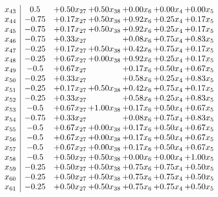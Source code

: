 \documentclass[8pt]{article}
\begin{document}
\[\begin{array}{c| c c@{\hskip 2pt} c@{\hskip 2pt} c@{\hskip 2pt} c@{\hskip 2pt} c@{\hskip 2pt} }
 x_{43}   &  0.5 & +  0.50 x_{27} & +  0.50 x_{38} & +  0.00 x_{6} & +  0.00 x_{4} & +  0.00 x_{5}\\
 x_{44}   &  -0.75 & +  0.17 x_{27} & +  0.50 x_{38} & +  0.92 x_{6} & +  0.25 x_{4} & +  0.17 x_{5}\\
 x_{45}   &  -0.75 & +  0.17 x_{27} & +  0.50 x_{38} & +  0.92 x_{6} & +  0.25 x_{4} & +  0.17 x_{5}\\
 x_{46}   &  -0.75 & +  0.33 x_{27} &   & +  0.08 x_{6} & +  0.75 x_{4} & +  0.83 x_{5}\\
 x_{47}   &  -0.25 & +  0.17 x_{27} & +  0.50 x_{38} & +  0.42 x_{6} & +  0.75 x_{4} & +  0.17 x_{5}\\
 x_{48}   &  -0.25 & +  0.67 x_{27} & +  0.00 x_{38} & +  0.92 x_{6} & +  0.25 x_{4} & +  0.17 x_{5}\\
 x_{49}   &  -0.5 & +  0.67 x_{27} &   & +  0.17 x_{6} & +  0.50 x_{4} & +  0.67 x_{5}\\
 x_{50}   &  -0.25 & +  0.33 x_{27} &   & +  0.58 x_{6} & +  0.25 x_{4} & +  0.83 x_{5}\\
 x_{51}   &  -0.25 & +  0.17 x_{27} & +  0.50 x_{38} & +  0.42 x_{6} & +  0.75 x_{4} & +  0.17 x_{5}\\
 x_{52}   &  -0.25 & +  0.33 x_{27} &   & +  0.58 x_{6} & +  0.25 x_{4} & +  0.83 x_{5}\\
 x_{53}   &  -0.5 & +  0.67 x_{27} & +  1.00 x_{38} & +  0.17 x_{6} & +  0.50 x_{4} & +  0.67 x_{5}\\
 x_{54}   &  -0.75 & +  0.33 x_{27} &   & +  0.08 x_{6} & +  0.75 x_{4} & +  0.83 x_{5}\\
 x_{55}   &  -0.5 & +  0.67 x_{27} & +  0.00 x_{38} & +  0.17 x_{6} & +  0.50 x_{4} & +  0.67 x_{5}\\
 x_{56}   &  -0.5 & +  0.67 x_{27} & +  0.00 x_{38} & +  0.17 x_{6} & +  0.50 x_{4} & +  0.67 x_{5}\\
 x_{57}   &  -0.5 & +  0.67 x_{27} & +  0.00 x_{38} & +  0.17 x_{6} & +  0.50 x_{4} & +  0.67 x_{5}\\
 x_{58}   &  -0.5 & +  0.50 x_{27} & +  0.50 x_{38} & +  0.00 x_{6} & +  0.00 x_{4} & +  1.00 x_{5}\\
 x_{59}   &  -0.25 & +  0.50 x_{27} & +  0.50 x_{38} & +  0.75 x_{6} & +  0.75 x_{4} & +  0.50 x_{5}\\
 x_{60}   &  -0.25 & +  0.50 x_{27} & +  0.50 x_{38} & +  0.75 x_{6} & +  0.75 x_{4} & +  0.50 x_{5}\\
 x_{61}   &  -0.25 & +  0.50 x_{27} & +  0.50 x_{38} & +  0.75 x_{6} & +  0.75 x_{4} & +  0.50 x_{5}\\

\end{array}\]
\end{document}
